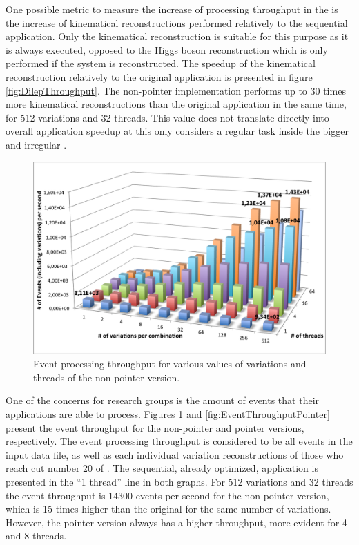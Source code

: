 One possible metric to measure the increase of processing throughput in the \ttDilepKinFit is the increase of kinematical reconstructions performed relatively to the sequential application. Only the kinematical reconstruction is suitable for this purpose as it is always executed, opposed to the Higgs boson reconstruction which is only performed if the \ttbar system is reconstructed. The speedup of the kinematical reconstruction relatively to the original application is presented in figure \ref{fig:DilepThroughput}. The non-pointer implementation performs up to 30 times more kinematical reconstructions than the original application in the same time, for 512 variations and 32 threads. This value does not translate directly into overall application speedup at this only considers a regular task inside the bigger and irregular \ttDilepKinFit.

\begin{figure}[!htp]
	\begin{center}
		\includegraphics[scale=0.6]{../../common/graphs/throughput.png}
		\caption{Event processing throughput for various values of variations and threads of the non-pointer version.}
		\label{fig:EventThroughput}
	\end{center}
\end{figure}

One of the concerns for research groups is the amount of events that their applications are able to process. Figures \ref{fig:EventThroughput} and \ref{fig:EventThroughputPointer} present the event throughput for the non-pointer and pointer versions, respectively. The event processing throughput is considered to be all events in the input data file, as well as each individual variation reconstructions of those who reach cut number 20 of \tth. The sequential, already optimized, application is presented in the ``1 thread'' line in both graphs. For 512 variations and 32 threads the event throughput is 14300 events per second for the non-pointer version, which is 15 times higher than the original for the same number of variations. However, the pointer version always has a higher throughput, more evident for 4 and 8 threads.

